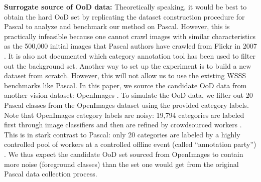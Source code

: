 \documentclass[10pt,twocolumn,letterpaper]{article}
\begin{document}
\textbf{Surrogate source of OoD data:}
Theoretically speaking, it would be best to obtain the hard OoD set by replicating the dataset construction procedure for Pascal \cite{everingham2010pascal} to analyze and benchmark our method on Pascal. 
However, this is practically infeasible because one cannot crawl images with similar characteristics as the 500,000 initial images that Pascal authors have crawled from Flickr in 2007 \cite{everingham2010pascal}. It is also not documented which category annotation tool has been used to filter out the background set.
Another way to set up the experiment is to build a new dataset from scratch.
However, this will not allow us to use the existing WSSS benchmarks like Pascal. 
In this paper, we source the candidate OoD data from another vision dataset: OpenImages \cite{kuznetsova2020open}. 
To simulate the OoD data, we filter out 20 Pascal classes from the OpenImages dataset using the provided category labels.
Note that OpenImages category labels are noisy: 19,794 categories are labeled first through image classifiers and then are refined by crowdsourced workers \cite{kuznetsova2020open}.
This is in stark contrast to Pascal: only 20 categories are labeled by a highly controlled pool of workers at a controlled offline event (called ``annotation party'') \cite{everingham2010pascal}. 
We thus expect the candidate OoD set sourced from OpenImages to contain more noise (\ie foreground classes) than the set one would get from the original Pascal data collection process.
\end{document}
